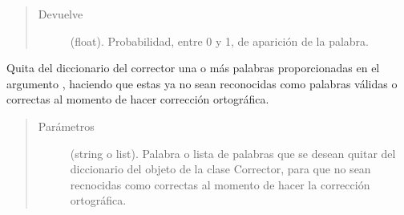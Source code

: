 \documentclass[letterpaper,10pt,openany,spanish]{sphinxmanual}
\begin{document}
\begin{fulllineitems}
\begin{fulllineitems}
\begin{quote}
\begin{description}
\item[{Devuelve}] \leavevmode
(float). Probabilidad, entre 0 y 1, de aparición de la palabra.

\end{description}\end{quote}

\end{fulllineitems}


\begin{fulllineitems}
\label{\detokenize{funciones/correccion:correccion.Corrector.quitar_palabras}}
Quita del diccionario del corrector una o más palabras proporcionadas en el argumento             , haciendo que estas ya no sean reconocidas como palabras válidas o             correctas al momento de hacer corrección ortográfica.
\begin{quote}\begin{description}
\item[{Parámetros}] \leavevmode
{} \textendash{} (string o list). Palabra o lista de palabras que se desean quitar del             diccionario del objeto de la clase Corrector, para que no sean recnocidas como             correctas al momento de hacer la corrección ortográfica.

\end{description}\end{quote}

\end{fulllineitems}


\end{fulllineitems}

\end{document}
